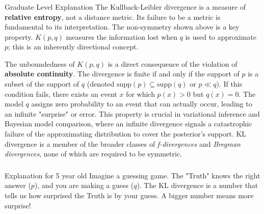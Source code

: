 \documentclass{article}
\begin{document}
\subsubsection*{\normalfont}{Graduate Level Explanation}
The Kullback-Leibler divergence is a measure of \textbf{relative entropy}, not a distance metric. Its failure to be a metric is fundamental to its interpretation. The non-symmetry shown above is a key property. $K(p, q)$ measures the information lost when $q$ is used to approximate $p$; this is an inherently directional concept.

The unboundedness of $K(p, q)$ is a direct consequence of the violation of \textbf{absolute continuity}. The divergence is finite if and only if the support of $p$ is a subset of the support of $q$ (denoted $\text{supp}(p) \subseteq \text{supp}(q)$ or $p \ll q$). If this condition fails, there exists an event $x$ for which $p(x) > 0$ but $q(x) = 0$. The model $q$ assigns zero probability to an event that can actually occur, leading to an infinite "surprise" or error. This property is crucial in variational inference and Bayesian model comparison, where an infinite divergence signals a catastrophic failure of the approximating distribution to cover the posterior's support. KL divergence is a member of the broader classes of \textit{f-divergences} and \textit{Bregman divergences}, none of which are required to be symmetric. 

\subsubsection*{\normalfont}{Explanation for 5 year old}
Imagine a guessing game. The "Truth" knows the right answer ($p$), and you are making a guess ($q$). The KL divergence is a number that tells us how surprised the Truth is by your guess. A bigger number means more surprise!
\end{document}
